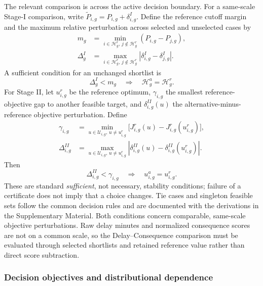 The relevant comparison is across the active decision boundary. For a same-scale Stage-I comparison, write $\widetilde P_{i,g}=P_{i,g}+\delta^I_{i,g}$. Define the reference cutoff margin and the maximum relative perturbation across selected and unselected cases by
\[
\begin{aligned}
m_g&=\min_{i\in\mathcal H_g^r,\,j\notin\mathcal H_g^r}
(P_{i,g}-P_{j,g}),\\
\Delta_g^I&=\max_{i\in\mathcal H_g^r,\,j\notin\mathcal H_g^r}
\left|\delta^I_{i,g}-\delta^I_{j,g}\right|.
\end{aligned}
\]
A sufficient condition for an unchanged shortlist is
\begin{equation}
\Delta_g^I<m_g\quad\Longrightarrow\quad\mathcal H_g^a=\mathcal H_g^r.
\label{eq:stage1_stability}
\end{equation}
For Stage II, let $u^r_{i,g}$ be the reference optimum, $\gamma_{i,g}$ the smallest reference-objective gap to another feasible target, and $\delta^{II}_{i,g}(u)$ the alternative-minus-reference objective perturbation. Define
\[
\begin{aligned}
\gamma_{i,g}&=\min_{u\in\mathcal U_{i,g},\,u\ne u^r_{i,g}}
\bigl[J^r_{i,g}(u)-J^r_{i,g}(u^r_{i,g})\bigr],\\
\Delta_{i,g}^{II}&=\max_{u\in\mathcal U_{i,g},\,u\ne u^r_{i,g}}
\left|\delta^{II}_{i,g}(u)-\delta^{II}_{i,g}(u^r_{i,g})\right|.
\end{aligned}
\]
Then
\begin{equation}
\Delta_{i,g}^{II}<\gamma_{i,g}
\quad\Longrightarrow\quad u^a_{i,g}=u^r_{i,g}.
\label{eq:stage2_stability}
\end{equation}
These are standard \emph{sufficient}, not necessary, stability conditions; failure of a certificate does not imply that a choice changes. Tie cases and singleton feasible sets follow the common decision rules and are documented with the derivations in the Supplementary Material. Both conditions concern comparable, same-scale objective perturbations. Raw delay minutes and normalized consequence scores are not on a common scale, so the Delay--Consequence comparison must be evaluated through selected shortlists and retained reference value rather than direct score subtraction.

\subsubsection{Decision objectives and distributional dependence}

